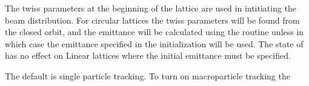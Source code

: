 {The twiss parameters at the beginning of the lattice are used in intitiating the
beam distribution.
For circular lattices the twiss parameters will be found from the closed orbit,
and the emittance will be calculated using the \bmad routine
 unless  in which case the emittance
specified in the initialization will be used. The state of 
has no effect on Linear lattices where the initial emittance must be specified.

The default is single particle tracking. To turn on macroparticle tracking the
\vn{global%
the \vn{tao_params} namelist above, for example,
\begin{example}
  \&tao_params
    n_v1_var_max  = 5
    n_d2_data_max = 6
    n_data_max    = 2000
    n_var_max     = 2000
    global%
    global%
  /
\end{example}

\section{Initializing Variables}
\label{s:init_var} 

}}
